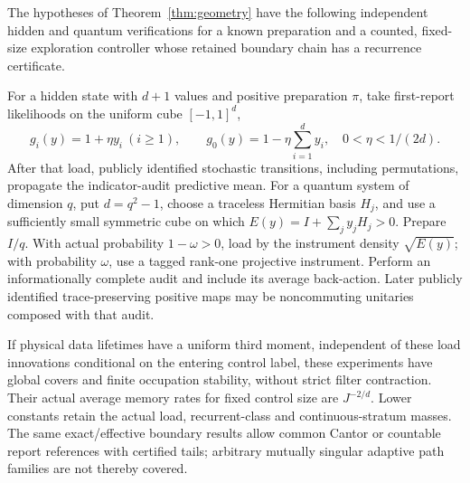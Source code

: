 \begin{corollary}\label{cor:rawgeometry}
The hypotheses of Theorem~\ref{thm:geometry} have the following independent hidden and quantum verifications for a known preparation and a counted, fixed-size exploration controller whose retained boundary chain has a recurrence certificate.

For a hidden state with $d+1$ values and positive preparation $\pi$, take first-report likelihoods on the uniform cube $[-1,1]^d$,
\begin{equation}\label{eq:loadhidden}
 g_i(y)=1+\eta y_i\ (i\ge1),\qquad
 g_0(y)=1-\eta\sum_{i=1}^d y_i,
 \quad0<\eta<1/(2d).
\end{equation}
After that load, publicly identified stochastic transitions, including permutations, propagate the indicator-audit predictive mean. For a quantum system of dimension $q$, put $d=q^2-1$, choose a traceless Hermitian basis $H_j$, and use a sufficiently small symmetric cube on which
$E(y)=I+\sum_jy_jH_j>0$.
Prepare $I/q$. With actual probability $1-\omega>0$, load by the instrument density $\sqrt{E(y)}$; with probability $\omega$, use a tagged rank-one projective instrument. Perform an informationally complete audit and include its average back-action. Later publicly identified trace-preserving positive maps may be noncommuting unitaries composed with that audit.

If physical data lifetimes have a uniform third moment, independent of these load innovations conditional on the entering control label, these experiments have global covers and finite occupation stability, without strict filter contraction. Their actual average memory rates for fixed control size are $J^{-2/d}$. Lower constants retain the actual load, recurrent-class and continuous-stratum masses. The same exact/effective boundary results allow common Cantor or countable report references with certified tails; arbitrary mutually singular adaptive path families are not thereby covered.
\end{corollary}
